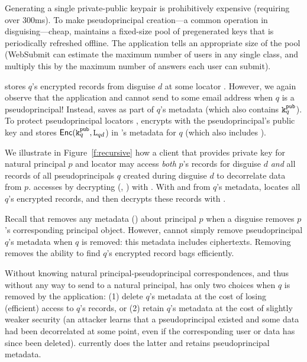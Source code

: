 Generating a single private-public keypair is prohibitively expensive (requiring over 300ms). To
make pseudoprincipal creation---a common operation in disguising---cheap, \sys maintains a
fixed-size pool of pregenerated keys that is periodically refreshed offline. The application tells
\sys an appropriate size of the pool (\eg WebSubmit can estimate the maximum number of users in any
single class, and multiply this by the maximum number of answers each user can submit).

\sys stores $q$'s encrypted records from disguise $d$ at some locator .  However, we again
observe that the application and \sys cannot send  to some email address when $q$ is a
pseudoprincipal! Instead, \sys saves  as part of $q$'s metadata (which also contains
$\texttt{\ensuremath{\texttt{k}^{\text{pub}}_{q}}}$).  To protect pseudoprincipal locators , \sys encrypts  with the
pseudoprincipal's public key  and stores $\mathsf{Enc}(\texttt{\ensuremath{\texttt{k}^{\text{pub}}_{q}}}, \texttt{L}_{qd}$) in \sys's metadata for
$q$ (which also includes ). 


We illustrate in Figure~\ref{f:recursive} how a client that provides private key  for
natural principal $p$ and locator  may access \emph{both} $p$'s records for disguise $d$
\emph{and} all records of all pseudoprincipals $q$ created during disguise $d$ to decorrelate data
from $p$.  \sys accesses  by decrypting \enc(, ) with . With
 and  from $q$'s metadata, \sys locates all $q$'s encrypted records,
and then decrypts these records with .


Recall that \sys removes any metadata (\eg {}) about principal $p$ when a disguise removes
$p$'s corresponding principal object.
However, \sys cannot simply remove pseudoprincipal $q$'s metadata when $q$ is removed: this metadata
includes  ciphertexts. Removing  removes the ability to find $q$'s encrypted
record bags efficiently.

Without knowing natural principal-pseudoprincipal correspondences, and thus without any way to send
 to a natural principal, \sys has only two choices when $q$ is removed by the application:
(1) delete $q$'s metadata at the cost of losing (efficient) access to $q$'s records, or (2) retain
$q$'s metadata at the cost of slightly weaker security (an attacker learns that a pseudoprincipal
existed and some data had been decorrelated at some point, even if the corresponding user or data
has since been deleted). \sys currently does the latter and retains pseudoprincipal metadata.

